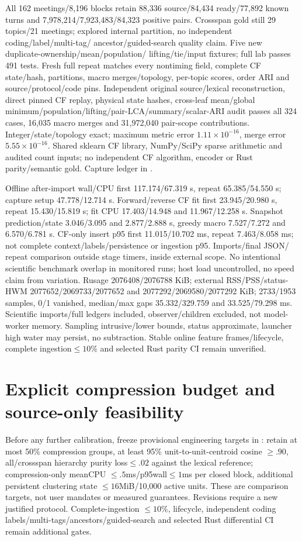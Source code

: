 \documentclass[11pt]{article}
\begin{document}
All 162 meetings/8,196 blocks retain 88,336 source/84,434 ready/77,892 known turns
and 7,978,214/7,923,483/84,323 positive pairs. Crossspan gold still 29 topics/21
meetings; explored internal partition, no independent coding/label/multi-tag/
ancestor/guided-search quality claim. Five new duplicate-ownership/mean/population/
lifting/tie/input fixtures; full lab passes 491 tests. Fresh full repeat matches
every nontiming field, complete CF state/hash, partitions, macro merges/topology,
per-topic scores, order ARI and source/protocol/code pins. Independent original
source/lexical reconstruction, direct pinned CF replay, physical state hashes,
cross-leaf mean/global minimum/population/lifting/pair-LCA/summary/scalar-ARI
audit passes all 324 cases, 16,035 macro merges and 31,972,040 pair-scope
contributions. Integer/state/topology exact; maximum metric error
$1.11\times10^{-16}$, merge error$5.55\times10^{-16}$. Shared sklearn CF library,
NumPy/SciPy sparse arithmetic and audited count inputs; no independent CF
algorithm, encoder or Rust parity/semantic gold. Capture ledger in
.

Offline after-import wall/CPU first 117.174/67.319 s, repeat 65.385/54.550 s;
capture setup 47.778/12.714 s. Forward/reverse CF fit first 23.945/20.980 s,
repeat 15.430/15.819 s; fit CPU 17.403/14.948 and 11.967/12.258 s. Snapshot
prediction/state 3.046/3.095 and 2.877/2.888 s, greedy macro 7.527/7.272 and
6.570/6.781 s. CF-only insert p95 first 11.015/10.702 ms, repeat 7.463/8.058 ms;
not complete context/labels/persistence or ingestion p95. Imports/final JSON/
repeat comparison outside stage timers, inside external scope. No intentional
scientific benchmark overlap in monitored runs; host load uncontrolled, no speed
claim from variation. Rusage 2076408/2076788 KiB; external RSS/PSS/status-HWM
2077652/2069733/2077652 and 2077292/2069580/2077292 KiB; 2733/1953 samples,
0/1 vanished, median/max gaps 35.332/329.759 and 33.525/79.298 ms. Scientific
imports/full ledgers included, observer/children excluded, not model-worker
memory. Sampling intrusive/lower bounds, status approximate, launcher high water
may persist, no subtraction. Stable online feature frames/lifecycle, complete
ingestion$\le10\%$ and selected Rust parity CI remain unverified.

\section{Explicit compression budget and source-only feasibility}
Before any further calibration, freeze provisional engineering targets in
: retain at most 50\% compression
groups, at least 95\% unit-to-unit-centroid cosine $\ge.90$, all/crossspan hierarchy
purity loss$\le.02$ against the lexical reference; compression-only meanCPU
$\le.5$ms/p95wall$\le1$ms per closed block, additional persistent clustering state
$\le16$MiB/10,000 active units. These are comparison targets, not user mandates or
measured guarantees. Revisions require a new justified protocol. Complete-ingestion
$\le10\%$, lifecycle, independent coding labels/multi-tags/ancestors/guided-search
and selected Rust differential CI remain additional gates.
\end{document}
